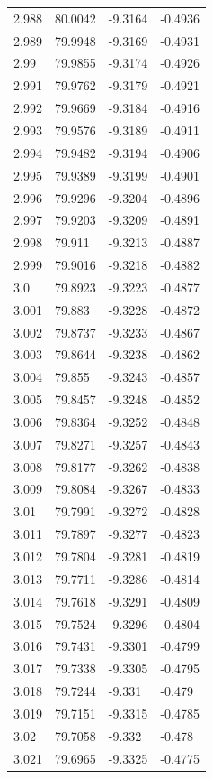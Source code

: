 \begin{tabular}{llll}
2.988 & 80.0042 & -9.3164 & -0.4936 \\
2.989 & 79.9948 & -9.3169 & -0.4931 \\
2.99 & 79.9855 & -9.3174 & -0.4926 \\
2.991 & 79.9762 & -9.3179 & -0.4921 \\
2.992 & 79.9669 & -9.3184 & -0.4916 \\
2.993 & 79.9576 & -9.3189 & -0.4911 \\
2.994 & 79.9482 & -9.3194 & -0.4906 \\
2.995 & 79.9389 & -9.3199 & -0.4901 \\
2.996 & 79.9296 & -9.3204 & -0.4896 \\
2.997 & 79.9203 & -9.3209 & -0.4891 \\
2.998 & 79.911 & -9.3213 & -0.4887 \\
2.999 & 79.9016 & -9.3218 & -0.4882 \\
3.0 & 79.8923 & -9.3223 & -0.4877 \\
3.001 & 79.883 & -9.3228 & -0.4872 \\
3.002 & 79.8737 & -9.3233 & -0.4867 \\
3.003 & 79.8644 & -9.3238 & -0.4862 \\
3.004 & 79.855 & -9.3243 & -0.4857 \\
3.005 & 79.8457 & -9.3248 & -0.4852 \\
3.006 & 79.8364 & -9.3252 & -0.4848 \\
3.007 & 79.8271 & -9.3257 & -0.4843 \\
3.008 & 79.8177 & -9.3262 & -0.4838 \\
3.009 & 79.8084 & -9.3267 & -0.4833 \\
3.01 & 79.7991 & -9.3272 & -0.4828 \\
3.011 & 79.7897 & -9.3277 & -0.4823 \\
3.012 & 79.7804 & -9.3281 & -0.4819 \\
3.013 & 79.7711 & -9.3286 & -0.4814 \\
3.014 & 79.7618 & -9.3291 & -0.4809 \\
3.015 & 79.7524 & -9.3296 & -0.4804 \\
3.016 & 79.7431 & -9.3301 & -0.4799 \\
3.017 & 79.7338 & -9.3305 & -0.4795 \\
3.018 & 79.7244 & -9.331 & -0.479 \\
3.019 & 79.7151 & -9.3315 & -0.4785 \\
3.02 & 79.7058 & -9.332 & -0.478 \\
3.021 & 79.6965 & -9.3325 & -0.4775 \\

\end{tabular}
